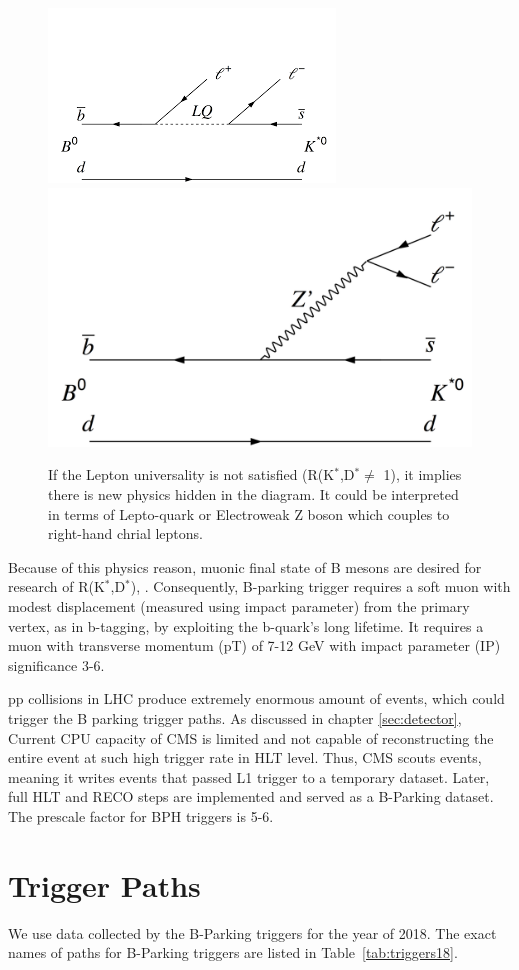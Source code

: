 \begin{figure}[h!]
  \caption{If the Lepton universality is not satisfied (R(K$^{*}$,D$^{*} \neq$ 1), it implies there is new physics hidden in the diagram. It could be interpreted in terms of Lepto-quark or Electroweak Z boson which couples to right-hand chrial leptons.}
  \label{fig:LU2}
  \centering
  \includegraphics[width=0.57\linewidth]{figs/LU2.png}
  \includegraphics[width=0.57\linewidth]{figs/LU4.png}
\end{figure}
Because of this physics reason, muonic final state of B mesons are desired for research of R(K$^{*}$,D$^{*}$), . 
Consequently, B-parking trigger requires a soft muon with modest displacement (measured using impact parameter) from the primary vertex, as in b-tagging, by exploiting the b-quark's long lifetime.
It requires a muon with transverse momentum (pT) of 7-12 GeV with impact parameter (IP) significance 3-6.

pp collisions in LHC produce extremely enormous amount of events, which could trigger the B parking trigger paths. 
 As discussed in chapter \ref{sec:detector}, Current CPU capacity of CMS is limited and not capable of reconstructing the entire event at such high trigger rate in HLT level.
Thus, CMS scouts events, meaning it writes events that passed L1 trigger to a temporary dataset. Later, full HLT and RECO steps are implemented and served as a B-Parking dataset. 
The prescale factor for BPH triggers is 5-6.


\section{Trigger Paths}
We use data collected by the B-Parking triggers for the year of 2018.
The exact names of paths for B-Parking triggers are listed in Table~\ref{tab:triggers18}.

